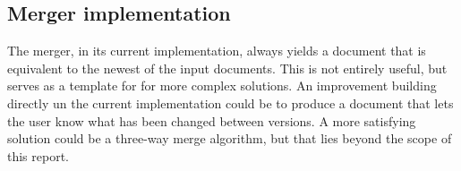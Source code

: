\subsection{Merger implementation}
\label{sec:merger-implementation}
The merger, in its current implementation, always yields a document that is equivalent to the newest of the input documents.
This is not entirely useful, but serves as a template for for more complex solutions. An improvement building directly un the current implementation could be to produce a document that lets the user know what has been changed between 
versions. A more satisfying solution could be a three-way merge algorithm, but that lies beyond  the scope of this report.
